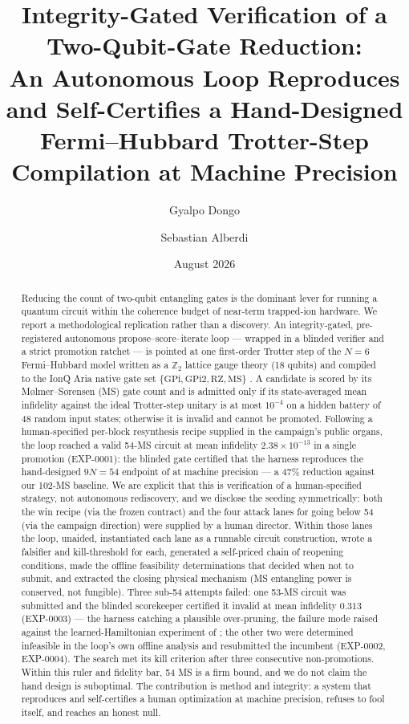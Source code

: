 \documentclass[11pt]{article}
\title{Integrity-Gated Verification of a Two-Qubit-Gate Reduction:\\
An Autonomous Loop Reproduces and Self-Certifies a Hand-Designed\\
Fermi--Hubbard Trotter-Step Compilation at Machine Precision}
\author{Gyalpo Dongo \and Sebastian Alberdi}
\date{August 2026}
\begin{document}
\maketitle

\begin{abstract}
Reducing the count of two-qubit entangling gates is the dominant lever for
running a quantum circuit within the coherence budget of near-term trapped-ion
hardware. We report a methodological replication rather than a discovery. An
integrity-gated, pre-registered autonomous propose--score--iterate loop --- wrapped
in a blinded verifier and a strict promotion ratchet --- is pointed at one
first-order Trotter step of the $N=6$ Fermi--Hubbard model written as a
$\mathbb{Z}_2$ lattice gauge theory (18 qubits) and compiled to the IonQ Aria
native gate set $\{\mathrm{GPi},\mathrm{GPi2},\mathrm{RZ},\mathrm{MS}\}$
\cite{Srinivasan2024}. A candidate is scored by its M{\o}lmer--S{\o}rensen (MS)
gate count and is admitted only if its state-averaged mean infidelity against the
ideal Trotter-step unitary is at most $10^{-4}$ on a hidden battery of 48 random
input states; otherwise it is invalid and cannot be promoted. Following a
human-specified per-block resynthesis recipe supplied in the campaign's public
organs, the loop reached a valid 54-MS circuit at mean infidelity
$2.38\times10^{-13}$ in a single promotion (EXP-0001): the blinded gate certified
that the harness reproduces the hand-designed $9N=54$ endpoint of
\cite{Srinivasan2024} at machine precision --- a 47\% reduction against our 102-MS
baseline. We are explicit that this is verification of a human-specified strategy,
not autonomous rediscovery, and we disclose the seeding symmetrically: both the win
recipe (via the frozen contract) and the four attack lanes for going below 54 (via
the campaign direction) were supplied by a human director. Within those lanes the
loop, unaided, instantiated each lane as a runnable circuit construction, wrote a
falsifier and kill-threshold for each, generated a self-priced chain of reopening
conditions, made the offline feasibility determinations that decided when not to
submit, and extracted the closing physical mechanism (MS entangling power is
conserved, not fungible). Three sub-54 attempts failed: one 53-MS circuit was
submitted and the blinded scorekeeper certified it invalid at mean infidelity
$0.313$ (EXP-0003) --- the harness catching a plausible over-pruning, the failure
mode raised against the learned-Hamiltonian experiment of \cite{Jafferis2022}; the
other two were determined infeasible in the loop's own offline analysis and
resubmitted the incumbent (EXP-0002, EXP-0004). The search met its kill criterion
after three consecutive non-promotions. Within this ruler and fidelity bar, 54 MS is
a firm bound, and we do not claim the hand design is suboptimal. The contribution is
method and integrity: a system that reproduces and self-certifies a human
optimization at machine precision, refuses to fool itself, and reaches an honest
null.
\end{abstract}
\end{document}
